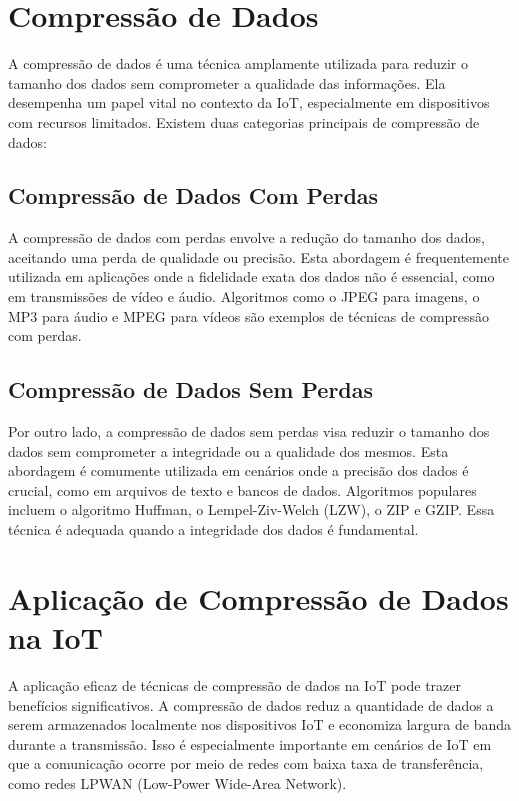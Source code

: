 \section{Compressão de Dados}
\label{sec:CompressãodeDados}

A compressão de dados é uma técnica amplamente utilizada para reduzir o tamanho dos dados sem comprometer a qualidade das informações. Ela desempenha um papel vital no contexto da IoT, especialmente em dispositivos com recursos limitados. Existem duas categorias principais de compressão de dados:

\subsection{Compressão de Dados Com Perdas}

A compressão de dados com perdas envolve a redução do tamanho dos dados, aceitando uma perda de qualidade ou precisão. Esta abordagem é frequentemente utilizada em aplicações onde a fidelidade exata dos dados não é essencial, como em transmissões de vídeo e áudio. Algoritmos como o JPEG para imagens, o MP3 para áudio e MPEG para vídeos são exemplos de técnicas de compressão com perdas\cite{sol}.

\subsection{Compressão de Dados Sem Perdas}

Por outro lado, a compressão de dados sem perdas visa reduzir o tamanho dos dados sem comprometer a integridade ou a qualidade dos mesmos. Esta abordagem é comumente utilizada em cenários onde a precisão dos dados é crucial, como em arquivos de texto e bancos de dados.
Algoritmos populares incluem o algoritmo Huffman, o Lempel-Ziv-Welch (LZW), o ZIP e GZIP. Essa técnica é adequada quando a integridade dos dados é fundamental\cite{ricardo}.

\section{Aplicação de Compressão de Dados na IoT}
\label{sec:AplicaçãodeCompressãodeDadosnaIoT}

A aplicação eficaz de técnicas de compressão de dados na IoT pode trazer benefícios significativos. A compressão de dados reduz a quantidade de dados a serem armazenados localmente nos dispositivos IoT e economiza largura de banda durante a transmissão. Isso é especialmente importante em cenários de IoT em que a comunicação ocorre por meio de redes com baixa taxa de transferência, como redes LPWAN (Low-Power Wide-Area Network)\cite{ricardo}.

